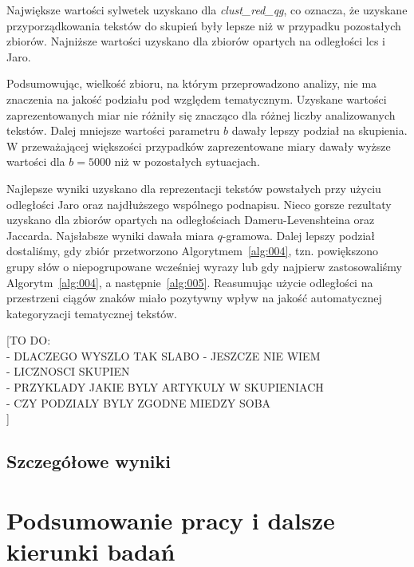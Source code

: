 \documentclass{praca1}
\begin{document}
Największe wartości sylwetek uzyskano dla \emph{clust\_red\_qg}, co oznacza, że uzyskane przyporządkowania tekstów do skupień były lepsze niż w przypadku pozostałych zbiorów. Najniższe wartości uzyskano dla zbiorów opartych na odległości lcs i Jaro.

\newpage
Podsumowując, wielkość zbioru, na którym przeprowadzono analizy, nie ma znaczenia na jakość podziału pod względem tematycznym. Uzyskane wartości zaprezentowanych miar nie różniły się znacząco dla różnej liczby analizowanych tekstów. Dalej mniejsze wartości parametru $b$ dawały lepszy podział na skupienia. W przeważającej większości przypadków zaprezentowane miary dawały wyższe wartości dla $b=5000$ niż w pozostałych sytuacjach.

Najlepsze wyniki uzyskano dla reprezentacji tekstów powstałych przy użyciu odległości Jaro oraz najdłuższego wspólnego podnapisu. Nieco gorsze rezultaty uzyskano dla zbiorów opartych na odległościach Dameru-Levenshteina oraz Jaccarda. Najsłabsze wyniki dawała miara $q$-gramowa. Dalej lepszy podział dostaliśmy, gdy zbiór przetworzono Algorytmem~\ref{alg:004}, tzn. powiększono grupy słów o niepogrupowane wcześniej wyrazy lub gdy najpierw zastosowaliśmy Algorytm~\ref{alg:004}, a następnie~\ref{alg:005}. Reasumując użycie odległości na przestrzeni ciągów znaków miało pozytywny wpływ na jakość automatycznej kategoryzacji tematycznej tekstów.


[TO DO:\\
- DLACZEGO WYSZLO TAK SLABO - JESZCZE NIE WIEM\\
- LICZNOSCI SKUPIEN\\
- PRZYKLADY JAKIE BYLY ARTYKULY W SKUPIENIACH\\
- CZY PODZIALY BYLY ZGODNE MIEDZY SOBA\\
]

\section{Szczegółowe wyniki}

\chapter{Podsumowanie pracy i dalsze kierunki badań}






\end{document}
